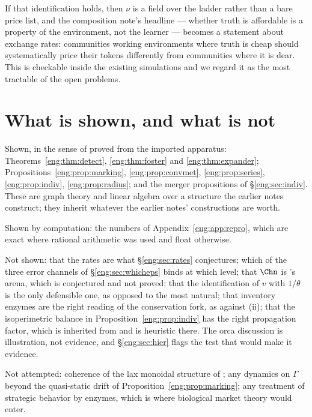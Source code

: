 If that identification holds, then $\nu$ is a field over the ladder rather
than a bare price list, and the composition note's headline --- whether
truth is affordable is a property of the environment, not the learner ---
becomes a statement about exchange rates: communities working environments
where truth is cheap should systematically price their tokens differently
from communities where it is dear. This is checkable inside the existing
simulations and we regard it as the most tractable of the open problems.

\section{What is shown, and what is not}\label{eng:S13}

Shown, in the sense of proved from the imported apparatus:
Theorems~\ref{eng:thm:detect}, \ref{eng:thm:foster} and \ref{eng:thm:expander};
Propositions~\ref{eng:prop:marking}, \ref{eng:prop:convmet}, \ref{eng:prop:series},
\ref{eng:prop:indiv}, \ref{eng:prop:radius}; and the merger propositions of
\S\ref{eng:sec:indiv}. These are graph theory and linear algebra over a
structure the earlier notes construct; they inherit whatever the earlier
notes' constructions are worth.

Shown by computation: the numbers of Appendix~\ref{eng:app:repro}, which are
exact where rational arithmetic was used and float otherwise.

Not shown: that the rates are what \S\ref{eng:sec:rates} conjectures; which of
the three error channels of \S\ref{eng:sec:whicheps} binds at which level;
that $\Chn$ is \chComp's arena, which is
conjectured and not proved; that the
identification of $v$ with $1/\theta$ is the only defensible one, as
opposed to the most natural; that inventory enzymes are the right reading
of the conservation fork, as against (ii); that the isoperimetric balance
in Proposition~\ref{eng:prop:indiv} has the right propagation factor, which is
inherited from \cite{compaut} and is heuristic there. The orca discussion
is illustration, not evidence, and \S\ref{eng:sec:hier} flags the test that
would make it evidence.

Not attempted: coherence of the lax monoidal structure of \chComp;
any dynamics on $\Gamma$ beyond the quasi-static drift of
Proposition~\ref{eng:prop:marking}; any treatment of strategic behavior by
enzymes, which is where biological market theory \cite{noe} would enter.

